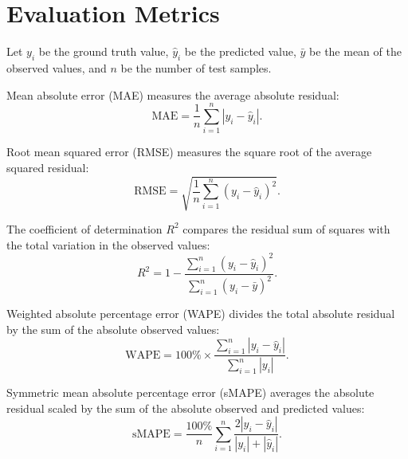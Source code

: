 \section[\appendixname~\thesection]{Evaluation Metrics}
\label{sec:appendix_b}

Let \(y_i\) be the ground truth value, \(\hat{y}_i\) be the predicted value, \(\bar{y}\) be the mean of the observed values, and \(n\) be the number of test samples.

Mean absolute error (MAE) measures the average absolute residual:
\begin{equation}
	\text{MAE} = \frac{1}{n} \sum_{i=1}^{n} \left| y_i - \hat{y}_i \right|.
\end{equation}

Root mean squared error (RMSE) measures the square root of the average squared residual:
\begin{equation}
	\text{RMSE} = \sqrt{
		\frac{1}{n}\sum_{i = 1}^{n} \left( y_i - \hat{y}_i \right)^2
	}.
\end{equation}

The coefficient of determination \(R^2\) compares the residual sum of squares with the total variation in the observed values:
\begin{equation}
	R^2 = 1 - \frac{\sum_{i=1}^{n} \left( y_i - \hat{y}_i \right)^2}{\sum_{i=1}^{n} \left( y_i - \bar{y} \right)^2}.
\end{equation}

Weighted absolute percentage error (WAPE) divides the total absolute residual by the sum of the absolute observed values:
\begin{equation}
	\text{WAPE} = 100\% \times
	\frac{\sum_{i=1}^{n} \left| y_i - \hat{y}_i \right|}
	{\sum_{i=1}^{n} \left| y_i \right|}.
\end{equation}

Symmetric mean absolute percentage error (sMAPE) averages the absolute residual scaled by the sum of the absolute observed and predicted values:
\begin{equation}
	\text{sMAPE} = \frac{100\%}{n} \sum_{i=1}^{n}
	\frac{2\left| y_i - \hat{y}_i \right|}
	{|y_i| + |\hat{y}_i|}.
\end{equation}
